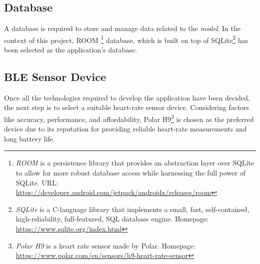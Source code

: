 \subsection{Database}
A database is required to store and manage data related to the \emph{model}. In the context of this project, ROOM \footnote{\emph{ROOM} is a persistence library that provides an abstraction layer over SQLite to allow for more robust database access while harnessing the full power of SQLite. URL: \url{https://developer.android.com/jetpack/androidx/releases/room}} database, which is built on top of SQLite\footnote{\emph{SQLite} is a C-language library that implements a small, fast, self-contained, high-reliability, full-featured, SQL database engine. Homepage: \url{https://www.sqlite.org/index.html}} has been selected as the application's database.

\subsection{BLE Sensor Device}
Once all the technologies required to develop the application have been decided, the next step is to select a suitable heart-rate sensor device. Considering factors like accuracy, performance, and affordability, Polar H9\footnote{\emph{Polar H9} is a heart rate sensor made by Polar. Homepage: \url{https://www.polar.com/en/sensors/h9-heart-rate-sensor}} is chosen as the preferred device due to its reputation for providing reliable heart-rate measurements and long battery life.